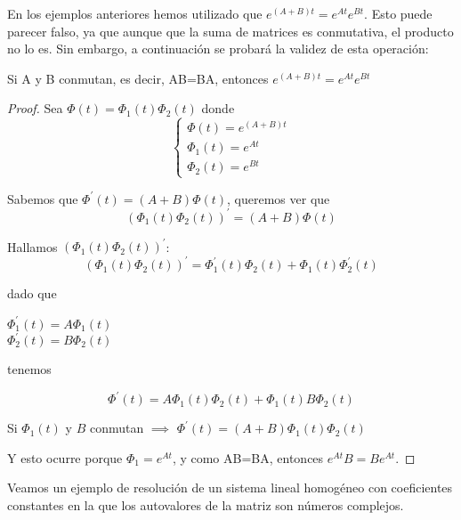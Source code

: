 En los ejemplos anteriores hemos utilizado que $e^{(A+B)t} = e^{At}e^{Bt}$. Esto puede parecer falso, ya que aunque que la suma de matrices es conmutativa, el producto no lo es. Sin embargo, a continuación se probará la validez de esta operación:

\begin{theorem}
Si A y B conmutan, es decir, AB=BA, entonces $e^{(A+B)t} = e^{At}e^{Bt}$
\end{theorem}
\begin{proof}
Sea $\Phi(t) = \Phi_1(t)\Phi_2(t)$ donde
\begin{equation*}
  \left\lbrace
  \begin{array}{l}
  	\Phi(t) = e^{(A+B)t}\\
	\Phi_1(t) = e^{At}\\
	\Phi_2(t) = e^{Bt}
  \end{array}
  \right.
\end{equation*}

Sabemos que $\Phi^\prime(t) = (A+B)\Phi(t)$, queremos ver que $$(\Phi_1(t)\Phi_2(t))^\prime = (A+B)\Phi(t)$$

Hallamos $(\Phi_1(t)\Phi_2(t))^\prime$:
$$(\Phi_1(t)\Phi_2(t))^\prime = \Phi^\prime_1(t)\Phi_2(t)+\Phi_1(t)\Phi^\prime_2(t)$$

dado que \begin{center}
$\Phi^\prime_1(t) = A\Phi_1(t)$\\
$\Phi^\prime_2(t) = B\Phi_2(t)$
\end{center}

tenemos

$$\Phi^\prime(t) = A\Phi_1(t)\Phi_2(t)+\Phi_1(t)B\Phi_2(t)$$

Si $\Phi_1(t)$ y $B$ conmutan $\implies$ $\Phi^\prime(t) = (A+B)\Phi_1(t)\Phi_2(t)$

Y esto ocurre porque $\Phi_1 = e^{At}$, y como AB=BA, entonces $e^{At} B = B e^{At}$.
\end{proof}

Veamos un ejemplo de resolución de un sistema lineal homogéneo con coeficientes constantes en la que los autovalores de la matriz son números complejos.


